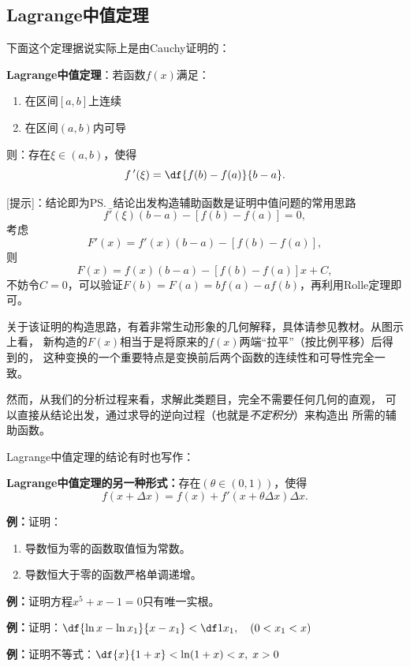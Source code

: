 \subsection{Lagrange中值定理}

下面这个定理据说实际上是由Cauchy证明的：

\begin{thx}
	{\bf Lagrange中值定理}：若函数$f(x)$满足：
	\begin{enumerate}[(1)]
	  \setlength{\itemindent}{1cm}
	  \item 在区间$[a,b]$上连续 
	  \item 在区间$(a,b)$内可导 
	\end{enumerate}
	则：存在$\xi\in(a,b)$，使得 
	$$f\,'(\xi)=\df{f(b)-f(a)}{b-a}.$$
\end{thx}

[提示]：结论即为\ps{\b 从结论出发构造辅助函数是证明中值问题的常用思路}
$$f'(\xi)(b-a)-[f(b)-f(a)]=0,$$
考虑
$$F'(x)=f'(x)(b-a)-[f(b)-f(a)],$$
则
$$F(x)=f(x)(b-a)-[f(b)-f(a)]x+C,$$
不妨令$C=0$，可以验证$F(b)=F(a)=bf(a)-af(b)$，再利用Rolle定理即可。

关于该证明的构造思路，有着非常生动形象的几何解释，具体请参见教材。从图示上看，
新构造的$F(x)$相当于是将原来的$f(x)$两端“拉平”（按比例平移）后得到的，
这种变换的一个重要特点是变换前后两个函数的连续性和可导性完全一致。

然而，从我们的分析过程来看，求解此类题目，完全不需要任何几何的直观，
可以直接从结论出发，通过求导的逆向过程（也就是{\it 不定积分}）来构造出
所需的辅助函数。

Lagrange中值定理的结论有时也写作：
\begin{thx}
	{\bf Lagrange中值定理的另一种形式：}存在$(\theta\in(0,1))$，使得
	$$f(x+\Delta x)=f(x)+f'(x+\theta\Delta x)\Delta x.$$
\end{thx}

{\bf 例：}证明：
\begin{enumerate}[(1)]
  \setlength{\itemindent}{1cm}
  \item 导数恒为零的函数取值恒为常数。
  \item 导数恒大于零的函数严格单调递增。
\end{enumerate}

{\bf 例：}证明方程$x^5+x-1=0$只有唯一实根。

{\bf 例：}证明：$\df{\ln x-\ln x_1}{x-x_1}<\df 1{x_1},\quad (0<x_1<x)$

{\bf 例：}证明不等式：$\df{x}{1+x}<\ln(1+x)<x,\;x>0$


